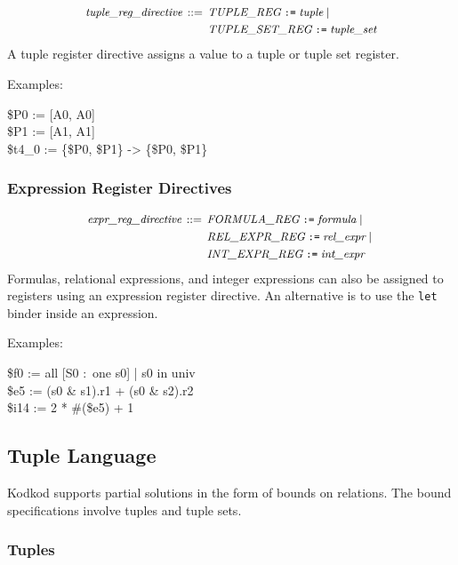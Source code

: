 \documentclass[a4paper,12pt]{article}
\begin{document}
$$\small\begin{aligned}
\textit{tuple\_reg\_directive} \,::=\, {}
    & \textit{TUPLE\_REG}\; \verb|:=|\; \textit{tuple} \mid {} \\
    & \textit{TUPLE\_SET\_REG}\; \verb|:=|\; \textit{tuple\_set}
\end{aligned}$$
%
A tuple register directive assigns a value to a tuple or tuple set register.

Examples:

\pre
\ttfamily\small
\$P0 := [A0, A0] \\
\$P1 := [A1, A1] \\
\$t4\_0 := \{\$P0, \$P1\} -> \{\$P0, \$P1\}
\post

\subsubsection{Expression Register Directives}
\label{expression-register-directives}

$$\small\begin{aligned}
\textit{expr\_reg\_directive} \,::=\, {}
    & \textit{FORMULA\_REG}\; \verb|:=|\; \textit{formula} \mid {} \\
    & \textit{REL\_EXPR\_REG}\; \verb|:=|\; \textit{rel\_expr} \mid {} \\
    & \textit{INT\_EXPR\_REG}\; \verb|:=|\; \textit{int\_expr}
\end{aligned}$$
%
Formulas, relational expressions, and integer expressions can also be assigned
to registers using an expression register directive. An alternative is to use
the \verb|let| binder inside an expression.

Examples:

\pre
\ttfamily\small
\$f0 := all [S0 :~one s0] | s0 in univ \\
\$e5 := (s0 \& s1).r1 + (s0 \& s2).r2 \\
\$i14 := 2 * \#(\$e5) + 1
\post

\subsection{Tuple Language}
\label{tuple-language}

Kodkod supports partial solutions in the form of bounds on relations. The bound
specifications involve tuples and tuple sets.

\subsubsection{Tuples}
\label{tuples}
\end{document}
